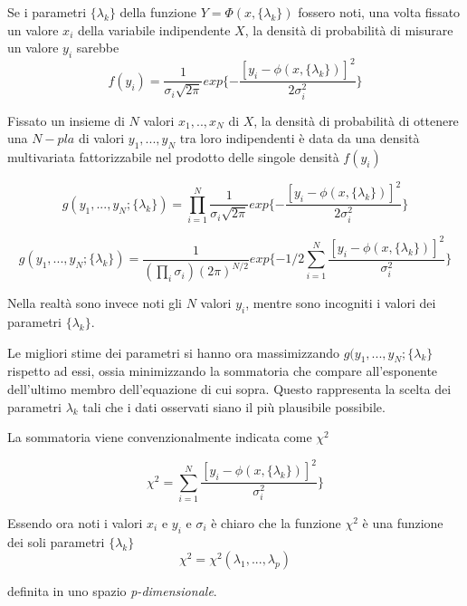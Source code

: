 \documentclass[12pt,openright,twoside,a4paper]{book}
\begin{document}
Se i parametri $\{\lambda_k\}$ della funzione $Y=\Phi(x,\{\lambda_k\})$ fossero noti, una volta fissato un valore $x_i$ della variabile indipendente $X$, la densità di probabilità di misurare un valore $y_i$ sarebbe
\begin{equation}
f(y_i)=\frac{1}{\sigma_i \sqrt{2\pi}} exp\{- \frac{[y_i - \phi(x,\{\lambda_k\})]^2}{2\sigma_i^2}\}
\end{equation}

Fissato un insieme di $N$ valori $x_1,..,x_N$ di $X$, la densità di probabilità di ottenere una $N-pla$ di valori $y_1,...,y_N$ tra loro indipendenti è data da una densità multivariata fattorizzabile nel prodotto delle singole densità $f(y_i)$

\begin{equation}
g(y_1,...,y_N;\{\lambda_k\})=\prod^{N}_{i=1}\frac{1}{\sigma_i \sqrt{2\pi}} exp\{- \frac{[y_i - \phi(x,\{\lambda_k\})]^2}{2\sigma_i^2}\}
\end{equation}

\begin{equation}
g(y_1,...,y_N;\{\lambda_k\})=\frac{1}{(\prod_{i}\sigma_i)(2\pi)^{N/2}} exp\{-1/2\sum^{N}_{i=1} \frac{[y_i - \phi(x,\{\lambda_k\})]^2}{\sigma_i^2}\}
\end{equation}


Nella realtà sono invece noti gli $N$ valori $y_i$, mentre sono incogniti i valori dei parametri $\{\lambda_k\}$.

Le migliori stime dei parametri si hanno ora massimizzando $g(y_1,...,y_N;\{\lambda_k\}$ rispetto ad essi, ossia minimizzando la sommatoria che compare all'esponente dell'ultimo membro dell'equazione di cui sopra.
Questo rappresenta la scelta dei parametri $\lambda_k$ tali che i dati osservati siano il più plausibile possibile.

La sommatoria viene convenzionalmente indicata come $\chi^2$

\begin{equation}
\chi^2=\sum^{N}_{i=1} \frac{[y_i - \phi(x,\{\lambda_k\})]^2}{\sigma_i^2}\}
\end{equation}

Essendo ora noti i valori $x_i$ e $y_i$ e $\sigma_i$ è chiaro che la funzione $\chi^2$ è una funzione dei soli parametri $\{\lambda_k\}$
\begin{equation}
\chi^2=\chi^2(\lambda_1,...,\lambda_p)
\end{equation}

definita in uno spazio \textit{p-dimensionale}.
\end{document}
